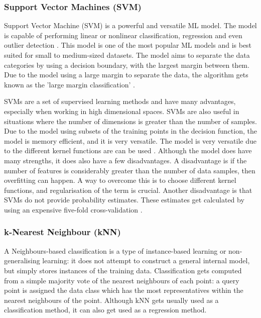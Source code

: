 	\subsubsection{Support Vector Machines (SVM)}
	Support Vector Machine (SVM) is a powerful and versatile ML model. The model is capable of performing linear or nonlinear classification, regression and even outlier detection \cite{geron2019hands, sklearn_svm}. This model is one of the most popular ML models and is best suited for small to medium-sized datasets. The model aims to separate the data categories by using a decision boundary, with the largest margin between them. Due to the model using a large margin to separate the data, the algorithm gets known as the 'large margin classification' \cite{geron2019hands}.
	
	SVMs are a set of supervised learning methods and have many advantages, especially when working in high dimensional spaces. SVMs are also useful in situations where the number of dimensions is greater than the number of samples. Due to the model using subsets of the training points in the decision function, the model is memory efficient, and it is very versatile. The model is very versatile due to the different kernel functions are can be used \cite{sklearn_svm}. Although the model does have many strengths, it does also have a few disadvantages. A disadvantage is if the number of features is considerably greater than the number of data samples, then overfitting can happen. A way to overcome this is to choose different kernel functions, and regularisation of the term is crucial. Another disadvantage is that SVMs do not provide probability estimates. These estimates get calculated by using an expensive five-fold cross-validation \cite{sklearn_svm}.

	
	\subsubsection{k-Nearest Neighbour (kNN)}
		\label{seb_sec:kNN}
		A Neighbours-based classification is a type of instance-based learning or non-generalising learning: it does not attempt to construct a general internal model, but simply stores instances of the training data. Classification gets computed from a simple majority vote of the nearest neighbours of each point: a query point is assigned the data class which has the most representatives within the nearest neighbours of the point. Although kNN gets usually used as a classification method, it can also get used as a regression method.
		
